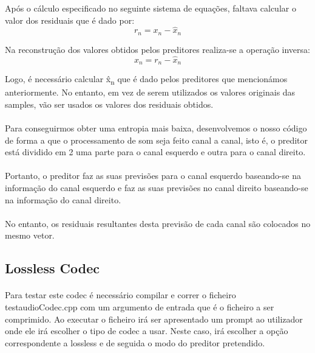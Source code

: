 \documentclass{report}
\begin{document}
Após o cálculo especificado no seguinte sistema
de equações, faltava calcular o valor dos residuais que é dado por:
\begin{equation}
    r_n = x_n - \hat{x}_n
\end{equation}

Na reconstrução dos valores obtidos pelos preditores realiza-se a operação inversa:
\begin{equation}
    x_n = r_n - \hat{x}_n
\end{equation}

Logo, é necessário calcular \^{x}\textsubscript{n} que é dado pelos preditores que mencionámos anteriormente. No entanto, em vez de serem utilizados os valores originais das samples, vão ser usados os valores dos residuais obtidos.

\paragraph{}

Para conseguirmos obter uma entropia mais baixa, desenvolvemos o nosso código de forma a que o processamento de som seja feito canal a canal, isto é, o preditor está dividido em 2 uma parte para o canal esquerdo e outra para o canal direito. \paragraph{}
Portanto, o preditor faz as suas previsões para o canal esquerdo baseando-se na informação do canal esquerdo e faz as suas previsões no canal direito baseando-se na informação do canal direito. \paragraph{}
No entanto, os residuais resultantes desta previsão de cada canal são colocados no mesmo vetor.

\subsection*{Lossless Codec}

\paragraph{}Para testar este codec é necessário compilar e correr o ficheiro test\textunderscore audioCodec.cpp com um argumento de entrada que é o ficheiro a ser comprimido. Ao executar o ficheiro irá ser apresentado um prompt ao utilizador onde ele irá escolher o tipo de codec a usar. Neste caso, irá escolher a opção correspondente a lossless e de seguida o modo do preditor pretendido.
\end{document}
